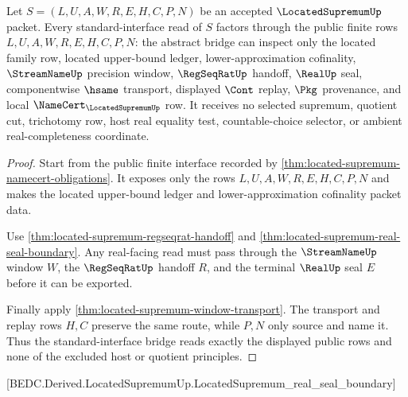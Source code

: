 \begin{theorem}
\label{thm:located-supremum-standard-bridge-route}
Let $S=(L,U,A,W,R,E,H,C,P,N)$ be an accepted $\LocatedSupremumUp$ packet. Every standard-interface read of $S$ factors through the public finite rows $L,U,A,W,R,E,H,C,P,N$: the abstract bridge can inspect only the located family row, located upper-bound ledger, lower-approximation cofinality, $\StreamNameUp$ precision window, $\RegSeqRatUp$ handoff, $\RealUp$ seal, componentwise $\hsame$ transport, displayed $\Cont$ replay, $\Pkg$ provenance, and local $\NameCert_{\LocatedSupremumUp}$ row. It receives no selected supremum, quotient cut, trichotomy row, host real equality test, countable-choice selector, or ambient real-completeness coordinate.
\end{theorem}
\begin{proof}
Start from the public finite interface recorded by \autoref{thm:located-supremum-namecert-obligations}. It exposes only the rows $L,U,A,W,R,E,H,C,P,N$ and makes the located upper-bound ledger and lower-approximation cofinality packet data.

Use \autoref{thm:located-supremum-regseqrat-handoff} and \autoref{thm:located-supremum-real-seal-boundary}. Any real-facing read must pass through the $\StreamNameUp$ window $W$, the $\RegSeqRatUp$ handoff $R$, and the terminal $\RealUp$ seal $E$ before it can be exported.

Finally apply \autoref{thm:located-supremum-window-transport}. The transport and replay rows $H,C$ preserve the same route, while $P,N$ only source and name it. Thus the standard-interface bridge reads exactly the displayed public rows and none of the excluded host or quotient principles.
\end{proof}

[BEDC.Derived.LocatedSupremumUp.LocatedSupremum\_real\_seal\_boundary]

